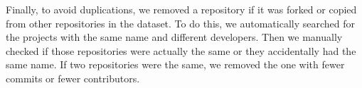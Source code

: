 Finally, to avoid duplications, we removed a repository if it was forked 
or copied from other repositories in the dataset. To do this, we automatically 
searched for the projects with the same name and different developers. 
Then we manually checked if those repositories were actually the same or 
they accidentally had the same name. If two repositories were the same, 
we removed the one with fewer commits or fewer contributors.





